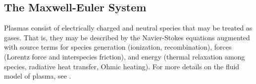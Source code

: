 \documentclass{article}
\begin{document}

\subsection{The Maxwell-Euler System}
Plasmas consist of electrically charged and neutral species that may be treated as gases. That is, they may be described by the Navier-Stokes equations augmented with source terms for species generation (ionization, recombination), forces (Lorentz force and interspecies friction), and energy (thermal relaxation among species, radiative heat transfer, Ohmic heating). For more details on the fluid model of plasma, see \cite{chen2016, remi_2014}.
\end{document}
